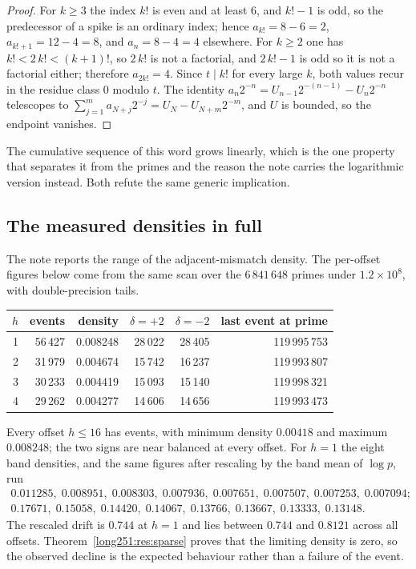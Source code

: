 \documentclass[11pt]{article}
\begin{document}
\begin{proof}
For $k\ge3$ the index $k!$ is even and at least $6$, and $k!-1$ is odd, so the
predecessor of a spike is an ordinary index; hence $a_{k!}=8-6=2$,
$a_{k!+1}=12-4=8$, and $a_n=8-4=4$ elsewhere.  For $k\ge2$ one has
$k!<2\,k!<(k+1)!$, so $2\,k!$ is not a factorial, and $2\,k!-1$ is odd so it is
not a factorial either; therefore $a_{2k!}=4$.  Since $t\mid k!$ for every
large $k$, both values recur in the residue class $0$ modulo $t$.  The identity
$a_n2^{-n}=U_{n-1}2^{-(n-1)}-U_n2^{-n}$ telescopes to
$\sum_{j=1}^{m}a_{N+j}2^{-j}=U_N-U_{N+m}2^{-m}$, and $U$ is bounded, so the
endpoint vanishes.
\end{proof}

The cumulative sequence of this word grows linearly, which is the one property
that separates it from the primes and the reason the note carries the
logarithmic version instead.  Both refute the same generic implication.

\subsection{The measured densities in full}\label{long251:sec:xr-densities}

The note reports the range of the adjacent-mismatch density.  The per-offset
figures below come from the same scan over the $6\,841\,648$ primes under
$1.2\times10^{8}$, with double-precision tails.

\begin{center}
\small
\begin{tabular}{@{}rrrrrr@{}}
\toprule
$h$ & events & density & $\delta=+2$ & $\delta=-2$ & last event at prime\\
\midrule
1 & 56\,427 & 0.008248 & 28\,022 & 28\,405 & 119\,995\,753\\
2 & 31\,979 & 0.004674 & 15\,742 & 16\,237 & 119\,993\,807\\
3 & 30\,233 & 0.004419 & 15\,093 & 15\,140 & 119\,998\,321\\
4 & 29\,262 & 0.004277 & 14\,606 & 14\,656 & 119\,993\,473\\
\bottomrule
\end{tabular}
\end{center}

Every offset $h\le16$ has events, with minimum density $0.00418$ and maximum
$0.008248$; the two signs are near balanced at every offset.  For $h=1$ the
eight band densities, and the same figures after rescaling by the band mean of
$\log p$, run
\[
\begin{array}{l}
 0.011285,\;0.008951,\;0.008303,\;0.007936,\;0.007651,\;0.007507,\;0.007253,\;0.007094;\\[2pt]
 0.17671,\;0.15058,\;0.14420,\;0.14067,\;0.13766,\;0.13667,\;0.13333,\;0.13148 .
\end{array}
\]
The rescaled drift is $0.744$ at $h=1$ and lies between $0.744$ and $0.8121$
across all offsets.  Theorem~\ref{long251:res:sparse} proves that the limiting density
is zero, so the observed decline is the expected behaviour rather than a
failure of the event.
\end{document}
